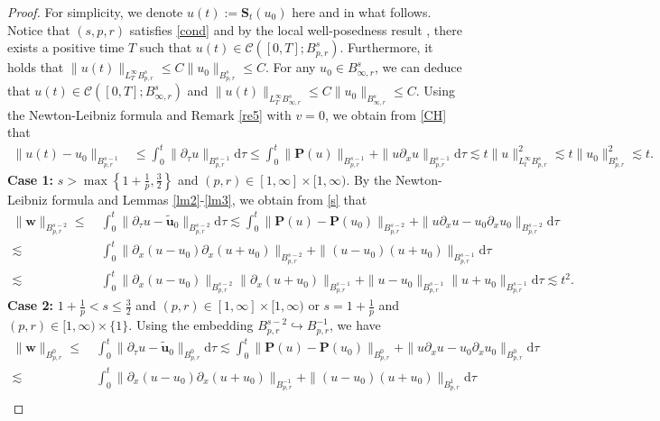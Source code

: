 \documentclass[12pt]{article}
\newcommand{\bal}{\begin{align}}
\newcommand{\pa}{\partial}
\newcommand{\dd}{\mathrm{d}}
\newcommand{\les}{\lesssim}
\newcommand{\f}{\left}
\newcommand{\g}{\right}
\begin{document}
\begin{proof}\; For simplicity, we denote $u(t):=\mathbf{S}_t(u_0)$ here and in what follows. Notice that $(s,p,r)$ satisfies \eqref{cond} and by the local well-posedness result \cite{d1,Li-Yin1,Ye}, there exists a positive time $T$ such that $u(t)\in \mathcal{C}([0,T];B_{p,r}^s)$. Furthermore, it holds that
$
\|u(t)\|_{L^\infty_TB^s_{p,r}}\leq C\|u_0\|_{B^s_{p,r}}\leq C.
$
For any $u_0\in B^s_{\infty,r}$, we can deduce that $u(t)\in \mathcal{C}([0,T];B_{\infty,r}^s)$ and
$
\|u(t)\|_{L^\infty_TB^s_{\infty,r}}\leq C\|u_0\|_{B^s_{\infty,r}}\leq C.
$
Using the Newton-Leibniz formula and Remark \ref{re5} with $v=0$, we obtain from \eqref{CH} that
\bal\label{s}
\|u(t)-u_0\|_{B^{s-1}_{p,r}}
&\leq \int^t_0\|\pa_\tau u\|_{B^{s-1}_{p,r}} \dd\tau
\leq \int^t_0\|\mathbf{P}(u)\|_{B^{s-1}_{p,r}}+\|u\pa_xu\|_{B^{s-1}_{p,r}} \dd\tau
\les t\|u\|^{2}_{L_t^\infty B^{s}_{p,r}}
\les t\|u_0\|^{2}_{B^{s}_{p,r}}\les t.
\end{align}
{\bf Case 1:} $s>\max\f\{1+\frac{1}{p},\frac{3}{2}\g\}$ and $(p, r)\in [1, \infty]\times [1, \infty)$.
By the Newton-Leibniz formula and Lemmas \ref{lm2}-\ref{lm3}, we obtain from \eqref{s} that
\begin{align*}
\|\mathbf{w}\|_{B^{s-2}_{p,r}}
\leq &~ \int^t_0\|\partial_\tau u-\mathbf{\widetilde{u}}_0\|_{B^{s-2}_{p,r}} \dd\tau
\les \int^t_0\|\mathbf{P}(u)-\mathbf{P}(u_0)\|_{B^{s-2}_{p,r}} +\|u\partial_xu-u_0\partial_xu_0\|_{B^{s-2}_{p,r}}\dd\tau
\nonumber\\
\les &~\int^t_0\|\pa_x(u-u_0)\pa_x(u+u_0)\|_{B^{s-2}_{p,r}}+\|(u-u_0)(u+u_0)\|_{B^{s-1}_{p,r}}\dd\tau\nonumber
\\
\les &~ \int^t_0\|\pa_x(u-u_0)\|_{B^{s-2}_{p,r}}\|\pa_x(u+u_0)\|_{B^{s-1}_{p,r}} +\|u-u_0\|_{B^{s-1}_{p,r}}\|u+u_0\|_{B^{s-1}_{p,r}}\dd\tau
\les  t^2.
\end{align*}
{\bf Case 2:} $1+\frac{1}{p}<s\leq\frac{3}{2}$ and $(p, r)\in [1, \infty]\times [1, \infty)$ or $s=1+\frac{1}{p}$ and $(p, r)\in [1, \infty)\times \{1\}$.
Using the embedding $B^{s-2}_{p,r}\hookrightarrow B^{-1}_{p,r}$, we have
\begin{align}\label{p2}
\|\mathbf{w}\|_{B^{0}_{p,r}}
\leq &~ \int^t_0\|\partial_\tau u-\mathbf{\widetilde{u}}_0\|_{B^{0}_{p,r}} \dd\tau
\les \int^t_0\|\mathbf{P}(u)-\mathbf{P}(u_0)\|_{B^{0}_{p,r}} +\|u\partial_xu-u_0\partial_xu_0\|_{B^{0}_{p,r}}\dd\tau
\nonumber\\
\les &~ \int^t_0\|\pa_x(u-u_0)\pa_x(u+u_0)\|_{B^{-1}_{p,r}} +\|(u-u_0)(u+u_0)\|_{B^{1}_{p,r}}\dd\tau\nonumber
\\

\end{align}
\end{proof}
\end{document}
